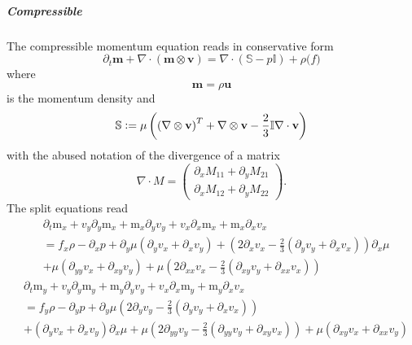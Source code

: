 \documentclass{article}
\begin{document}
\subparagraph{Compressible}
\label{subp:Compressible}
The compressible momentum equation reads in conservative form
\begin{equation}
  \partial_t \mathbf{m} + \nabla \cdot (\mathbf{m}\otimes\mathbf{v}) = \nabla \cdot (\mathbb{S} - p \mathbb{I}) + \rho \mathbb(f)
\end{equation}
where
\begin{equation}
  \mathbf{m} = \rho \mathbf{u}
\end{equation}
is the momentum density and
\begin{equation}
  \mathbb{S} \mathrel{\mathop:}= \mu \left({(\nabla\otimes\mathbf{v})}^T + \nabla\otimes\mathbf{v} - \frac{2}{3}\mathbb{I}\nabla\cdot\mathbf{v} \right)
\end{equation}
with the abused notation of the divergence of a matrix
\begin{equation}
  \nabla \cdot M =
  \begin{pmatrix}
    \partial_x M_{11} + \partial_y M_{21} \\
    \partial_x M_{12} + \partial_y M_{22}
  \end{pmatrix}.
\end{equation}
The split equations read
\begin{equation}
  \begin{aligned}
    & \partial_t \text{m}_x
    + v_y \partial_y \text{m}_x
    + \text{m}_x \partial_y v_y
    + v_x \partial_x \text{m}_x
    + \text{m}_x \partial_x v_x \\
    & =
    f_x \rho - \partial_x p
    + \partial_y \mu  \left( \partial_y v_x
    + \partial_x v_y\right)
    + \left(2  \partial_x v_x-\frac{2}{3}  \left(\partial_y v_y
    + \partial_x v_x\right)\right) \partial_x \mu \\
    & + \mu   \left(\partial_{yy} v_x
    + \partial_{xy} v_y \right)
    + \mu   \left(2 \partial_{xx} v_x - \frac{2}{3}  \left( \partial_{xy} v_y
    + \partial_{xx} v_x\right)\right)
  \end{aligned}
\end{equation}
\begin{equation}
  \begin{aligned}
    & \partial_t \text{m}_y
    + v_y \partial_y \text{m}_y
    + \text{m}_y \partial_y v_y
    + v_x \partial_x \text{m}_y
    + \text{m}_y \partial_x v_x \\
    & =
    f_y \rho - \partial_y p
    + \partial_y \mu  \left(2 \partial_y v_y-\frac{2}{3} \left(\partial_y v_y
    + \partial_x v_x\right)\right) \\
    &
    + \left(\partial_y v_x
    + \partial_x v_y\right) \partial_x \mu
    + \mu  \left(2 \partial_{yy} v_y - \frac{2}{3} \left(\partial_{yy} v_y
    + \partial_{xy} v_x\right)\right)
    + \mu  \left(\partial_{xy} v_x
    + \partial_{xx} v_y\right)
  \end{aligned}
\end{equation}
\end{document}
